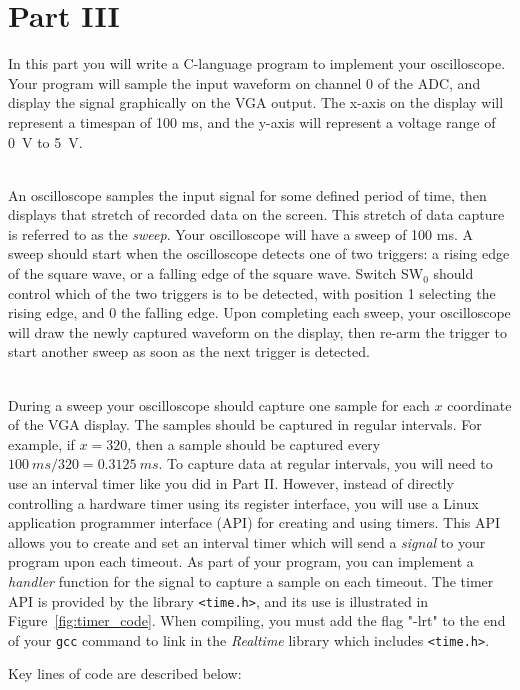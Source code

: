 \documentclass[epsfig,10pt,fullpage]{article}
\begin{document}
\noindent
\section*{Part III}

In this part you will write a C-language program to implement your oscilloscope.
Your program will sample the input waveform on channel 0 of the ADC, 
and display the signal graphically on the VGA output. The x-axis on the display will represent 
a timespan of 100 ms, and the y-axis will represent a voltage range of 0~V to 5~V. 

~\\
\noindent
An oscilloscope samples the input signal for some defined period of time, then displays that
stretch of recorded data on the screen. This stretch of data capture is referred to as the
{\it sweep}. Your oscilloscope will have a sweep of 100 ms. A sweep should start when
the oscilloscope detects one of two triggers: a rising edge of the square wave, or a falling edge 
of the square wave. Switch SW$_0$ should control which of the two triggers is to be detected, 
with position 1 selecting the rising edge, and 0 the falling edge. Upon completing each sweep, 
your oscilloscope will draw the newly captured waveform on the display, then re-arm the trigger
to start another sweep as soon as the next trigger is detected.

~\\
\noindent
During a sweep your oscilloscope should capture one sample for each $x$ coordinate of the 
VGA display. The samples should be captured in regular intervals. For example, if
$x=320$, then a sample should be captured every $100~ ms / 320 = 0.3125~ms$. To capture data 
at regular intervals, you will need to use an interval timer like you did in Part II. However,
instead of directly controlling a hardware timer using its register interface, you will use 
a Linux application programmer interface (API) for creating and using timers. This API allows 
you to create and set an interval timer which will send a {\it signal} to your program upon 
each timeout. As part of your program, you can implement a {\it handler} function for the signal to 
capture a sample on each timeout. The timer API is provided by the library \texttt{<time.h>}, 
and its use is illustrated in Figure~\ref{fig:timer_code}. When compiling, you must add the 
flag "-lrt" to the end of your \texttt{gcc} command to link in the \textit{Realtime} library 
which includes \texttt{<time.h>}. 

\newpage
Key lines of code are described below:
\end{document}
